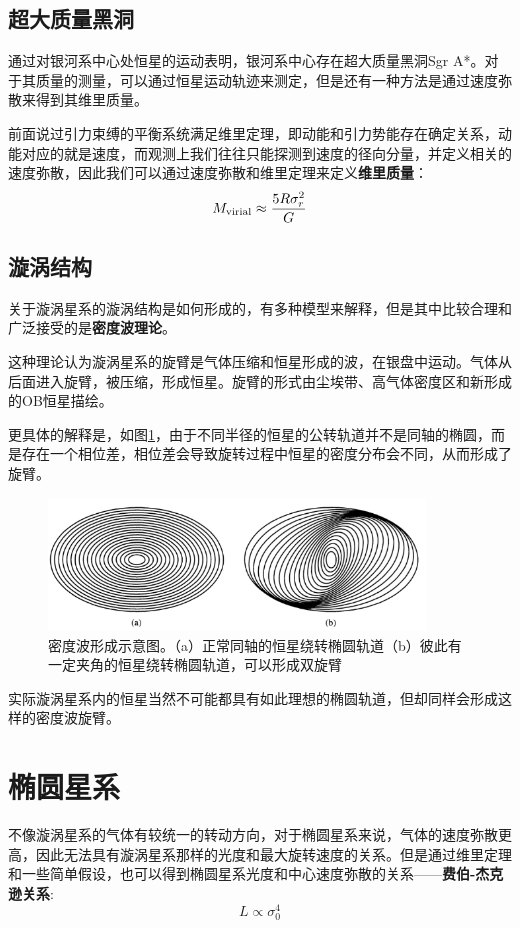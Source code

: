 \documentclass[openany]{ctexbook}
\begin{document}
\subsection{超大质量黑洞}
通过对银河系中心处恒星的运动表明，银河系中心存在超大质量黑洞Sgr A*。对于其质量的测量，可以通过恒星运动轨迹来测定，但是还有一种方法是通过速度弥散来得到其维里质量。

前面说过引力束缚的平衡系统满足维里定理，即动能和引力势能存在确定关系，动能对应的就是速度，而观测上我们往往只能探测到速度的径向分量，并定义相关的速度弥散，因此我们可以通过速度弥散和维里定理来定义\textbf{维里质量}：
\begin{equation}
  M_\mathrm{virial}\approx{5R\sigma_r^2\over G}
\end{equation}

\subsection{漩涡结构}
关于漩涡星系的漩涡结构是如何形成的，有多种模型来解释，但是其中比较合理和广泛接受的是\textbf{密度波理论}。

这种理论认为漩涡星系的旋臂是气体压缩和恒星形成的波，在银盘中运动。气体从后面进入旋臂，被压缩，形成恒星。旋臂的形式由尘埃带、高气体密度区和新形成的OB恒星描绘。

更具体的解释是，如图\ref{fig:densitywave}，由于不同半径的恒星的公转轨道并不是同轴的椭圆，而是存在一个相位差，相位差会导致旋转过程中恒星的密度分布会不同，从而形成了旋臂。

\begin{figure}[hbt]
  \centering
  \includegraphics[width=10cm]{chapters/25/densitywave}
  \caption{密度波形成示意图。（a）正常同轴的恒星绕转椭圆轨道（b）彼此有一定夹角的恒星绕转椭圆轨道，可以形成双旋臂}
  \label{fig:densitywave}
\end{figure}

实际漩涡星系内的恒星当然不可能都具有如此理想的椭圆轨道，但却同样会形成这样的密度波旋臂。

\section{椭圆星系}
不像漩涡星系的气体有较统一的转动方向，对于椭圆星系来说，气体的速度弥散更高，因此无法具有漩涡星系那样的光度和最大旋转速度的关系。但是通过维里定理和一些简单假设，也可以得到椭圆星系光度和中心速度弥散的关系——\textbf{费伯-杰克逊关系}:
\begin{equation}
  L\propto\sigma_0^4
\end{equation}
\end{document}
